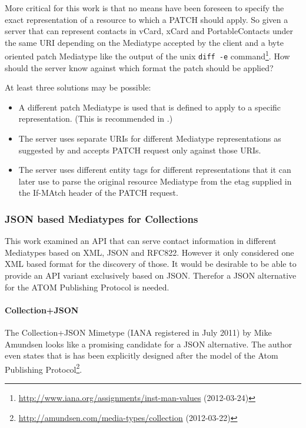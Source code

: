 \documentclass[12pt,a4paper,twoside]{scrartcl}		%
\newcommand{\citeurl}[2]{\url{#1} (#2)}
\begin{document}
More critical for this work is that no means have been foreseen to specify the
exact representation of a resource to which a PATCH should apply. So given a
server that can represent contacts in vCard, xCard and PortableContacts under
the same URI depending on the Mediatype accepted by the client and a byte
oriented patch Mediatype like the output of the unix \lstinline:diff -e:
command\footnote{\citeurl{http://www.iana.org/assignments/inst-man-values}{2012-03-24}}. How
should the server know against which format the patch should be applied?

At least three solutions may be possible:
\begin{itemize}
\item A different patch Mediatype is used that is defined to apply to a specific
  representation. (This is recommended in \cite[ch. 11.9]{Allamaraju_2010}.)
\item The server uses separate URIs for different Mediatype representations as
  suggested by \cite{Raman2006} and accepts PATCH request only against those
  URIs.
\item The server uses different entity tags for different representations that it can later use to parse the original resource Mediatype from the etag supplied in the If-MAtch header of the PATCH request.
\end{itemize}

\subsubsection{JSON based Mediatypes for Collections}
\label{sec:media-types-coll}

This work examined an API that can serve contact information in different
Mediatypes based on XML, JSON and RFC822. However it only considered one XML
based format for the discovery of those. It would be desirable to be able to
provide an API variant exclusively based on JSON. Therefor a JSON alternative
for the ATOM Publishing Protocol is needed.

\paragraph{Collection+JSON}
\label{sec:collection+json}

The Collection+JSON Mimetype (IANA registered in July 2011) by Mike
Amundsen\cite{Amundsen2011a}\cite[ch. 3]{amundsen2011building} looks like a
promising candidate for a JSON alternative. The author even states that is has
been explicitly designed after the model of the Atom Publishing
Protocol\footnote{\citeurl{http://amundsen.com/media-types/collection}{2012-03-22}}.
\end{document}
